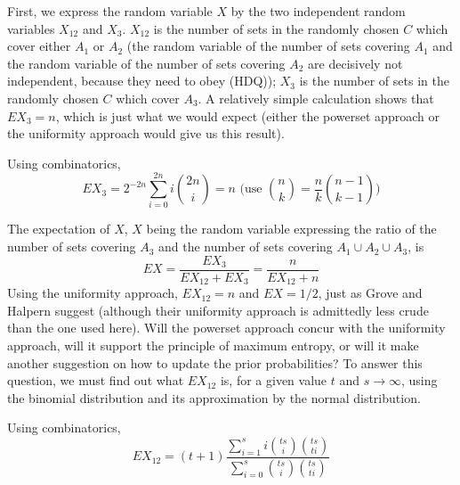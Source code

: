 \documentclass[11pt]{article}
\begin{document}
First, we express the random variable $X$ by the two independent
random variables $X_{12}$ and $X_{3}$. $X_{12}$ is the number of sets in
the randomly chosen $C$ which cover either $A_{1}$ or $A_{2}$ (the
random variable of the number of sets covering $A_{1}$ and the random
variable of the number of sets covering $A_{2}$ are decisively not
independent, because they need to obey (HDQ)); $X_{3}$ is the number
of sets in the randomly chosen $C$ which cover $A_{3}$. A relatively
simple calculation shows that $EX_{3}=n$, which is just what we
would expect (either the powerset approach or the uniformity approach
would give us this result).

Using combinatorics,
\begin{displaymath}
  EX_{3}=2^{-2n}\sum_{i=0}^{2n}i\binom{2n}{i}=n\mbox{ (use }\binom{n}{k}=\frac{n}{k}\binom{n-1}{k-1}\mbox{)}
\end{displaymath}

The expectation of $X$, $X$ being the random variable expressing the
ratio of the number of sets covering $A_{3}$ and the number of sets
covering $A_{1}\cup{}A_{2}\cup{}A_{3}$, is
\begin{displaymath}
  EX=\frac{EX_{3}}{EX_{12}+EX_{3}}=\frac{n}{EX_{12}+n}
\end{displaymath}
Using the uniformity approach, $EX_{12}=n$ and $EX=1/2$, just as Grove
and Halpern suggest (although their uniformity approach is admittedly
less crude than the one used here). Will the powerset approach concur
with the uniformity approach, will it support the principle of maximum
entropy, or will it make another suggestion on how to update the prior
probabilities? To answer this question, we must find out what $EX_{12}$
is, for a given value $t$ and $s\rightarrow\infty$, using the binomial
distribution and its approximation by the normal distribution.

Using combinatorics,
\begin{displaymath}
  EX_{12}=(t+1)\frac{\sum_{i=1}^{s}i\binom{ts}{i}\binom{ts}{ti}}{\sum_{i=0}^{s}\binom{ts}{i}\binom{ts}{ti}}
\end{displaymath}
\end{document}
